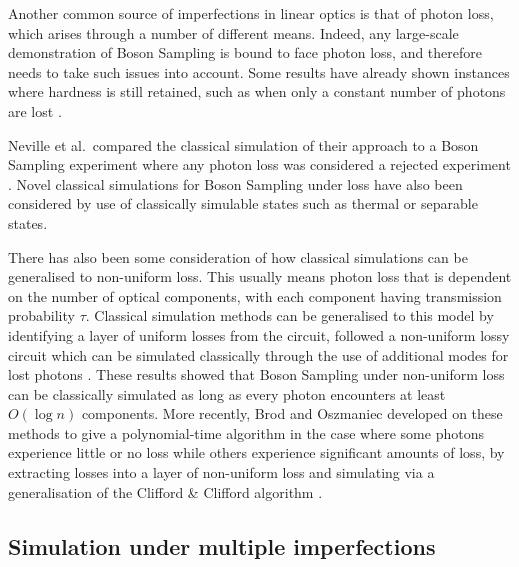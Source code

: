 Another common source of imperfections in linear optics is that of photon loss, which arises through a number of different means. 
Indeed, any large-scale demonstration of Boson Sampling is bound to face photon loss, and therefore needs to take such issues into account. 
Some results have already shown instances where hardness is still retained, such as when only a constant number of photons are lost \cite{aaronson2016,wang2018}.

Neville et al.\ compared the classical simulation of their approach to a Boson Sampling experiment where any photon loss was considered a rejected experiment \cite{neville2017}. Novel classical simulations for Boson Sampling under loss have also been considered by use of classically simulable states such as thermal \cite{garciapatron2017} or separable \cite{oszmaniec2018} states.

There has also been some consideration of how classical simulations can be generalised to non-uniform loss. 
This usually means photon loss that is dependent on the number of optical components, with each component having transmission probability $\tau$. 
Classical simulation methods can be generalised to this model by identifying a layer of uniform losses from the circuit, followed a non-uniform lossy circuit which can be simulated classically through the use of additional modes for lost photons \cite{garciapatron2017,oszmaniec2018}. 
These results showed that Boson Sampling under non-uniform loss can be classically simulated as long as every photon encounters at least $O(\log n)$ components. More recently, Brod and Oszmaniec developed on these methods to give a polynomial-time algorithm in the case where some photons experience little or no loss while others experience significant amounts of loss, by extracting losses into a layer of non-uniform loss and simulating via a generalisation of the Clifford \& Clifford algorithm \cite{brod2019}.

\subsection{Simulation under multiple imperfections}
\label{sec:renema-review}


